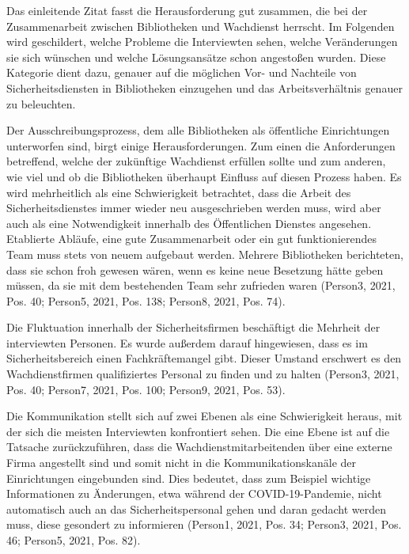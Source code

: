 \documentclass[a4paper,
fontsize=11pt,
oneside,
numbers=noperiodatend,
parskip=half-,
bibliography=totoc,
final
]{scrartcl}
\begin{document}
Das einleitende Zitat fasst die Herausforderung gut zusammen, die bei
der Zusammenarbeit zwischen Bibliotheken und Wachdienst herrscht. Im
Folgenden wird geschildert, welche Probleme die Interviewten sehen,
welche Veränderungen sie sich wünschen und welche Lösungsansätze schon
angestoßen wurden. Diese Kategorie dient dazu, genauer auf die möglichen
Vor- und Nachteile von Sicherheitsdiensten in Bibliotheken einzugehen
und das Arbeitsverhältnis genauer zu beleuchten.

Der Ausschreibungsprozess, dem alle Bibliotheken als öffentliche
Einrichtungen unterworfen sind, birgt einige Herausforderungen. Zum
einen die Anforderungen betreffend, welche der zukünftige Wachdienst
erfüllen sollte und zum anderen, wie viel und ob die Bibliotheken
überhaupt Einfluss auf diesen Prozess haben. Es wird mehrheitlich als
eine Schwierigkeit betrachtet, dass die Arbeit des Sicherheitsdienstes
immer wieder neu ausgeschrieben werden muss, wird aber auch als eine
Notwendigkeit innerhalb des Öffentlichen Dienstes angesehen. Etablierte
Abläufe, eine gute Zusammenarbeit oder ein gut funktionierendes Team
muss stets von neuem aufgebaut werden. Mehrere Bibliotheken berichteten,
dass sie schon froh gewesen wären, wenn es keine neue Besetzung hätte
geben müssen, da sie mit dem bestehenden Team sehr zufrieden waren
(Person3, 2021, Pos. 40; Person5, 2021, Pos. 138; Person8, 2021, Pos.
74).

Die Fluktuation innerhalb der Sicherheitsfirmen beschäftigt die Mehrheit
der interviewten Personen. Es wurde außerdem darauf hingewiesen, dass es
im Sicherheitsbereich einen Fachkräftemangel gibt. Dieser Umstand
erschwert es den Wachdienstfirmen qualifiziertes Personal zu finden und
zu halten (Person3, 2021, Pos. 40; Person7, 2021, Pos. 100; Person9,
2021, Pos. 53).

Die Kommunikation stellt sich auf zwei Ebenen als eine Schwierigkeit
heraus, mit der sich die meisten Interviewten konfrontiert sehen. Die
eine Ebene ist auf die Tatsache zurückzuführen, dass die
Wachdienstmitarbeitenden über eine externe Firma angestellt sind und
somit nicht in die Kommunikationskanäle der Einrichtungen eingebunden
sind. Dies bedeutet, dass zum Beispiel wichtige Informationen zu
Änderungen, etwa während der COVID-19-Pandemie, nicht automatisch auch
an das Sicherheitspersonal gehen und daran gedacht werden muss, diese
gesondert zu informieren (Person1, 2021, Pos. 34; Person3, 2021, Pos.
46; Person5, 2021, Pos. 82).
\end{document}
